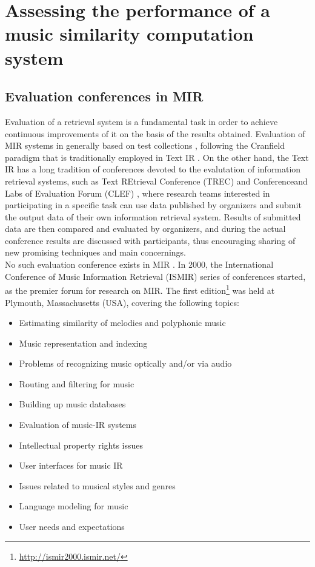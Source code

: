 \chapter{Assessing the performance of a music similarity computation system} 

\label{Chapter3} 


\section{Evaluation conferences in MIR}

Evaluation of a retrieval system is a fundamental task in order to achieve continuous improvements of it on the basis of the results obtained. Evaluation of MIR systems in generally based on test collections \cite{sanderson10}, following the Cranfield paradigm that is traditionally employed in Text IR \cite{harman11} \cite{gomez14}. On the other hand, the Text IR has a long tradition of conferences devoted to the evalutation of information retrieval systems, such as Text REtrieval Conference (TREC) \cite{trec05} and Conferenceand Labs of Evaluation Forum (CLEF) \cite{clef00}, where research teams interested in participating in a specific task can use data published by organizers and submit the output data of their own information retrieval system. Results of submitted data are then compared and evaluated by organizers, and during the actual conference results are discussed with participants, thus encouraging sharing of new promising techniques and main concernings. \\
No such evaluation conference exists in MIR \cite{gomez14}. In 2000, the International Conference of Music Information Retrieval (ISMIR) series of conferences started, as the premier forum for research on MIR. The first edition\footnote{\url{http://ismir2000.ismir.net/}} was held at Plymouth, Massachusetts (USA), covering the following topics: 
\begin{itemize}
\item Estimating similarity of melodies and polyphonic music
\item Music representation and indexing
\item Problems of recognizing music optically and/or via audio
\item Routing and filtering for music
\item Building up music databases
\item Evaluation of music-IR systems
\item Intellectual property rights issues
\item User interfaces for music IR
\item Issues related to musical styles and genres
\item Language modeling for music
\item User needs and expectations
\end{itemize}
